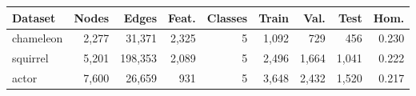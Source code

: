 \begin{tabular}{lrrrrrrrr}
\toprule
Dataset & Nodes & Edges & Feat. & Classes & Train & Val. & Test & Hom. \\
\midrule
chameleon & 2,277 & 31,371 & 2,325 & 5 & 1,092 & 729 & 456 & 0.230 \\
squirrel & 5,201 & 198,353 & 2,089 & 5 & 2,496 & 1,664 & 1,041 & 0.222 \\
actor & 7,600 & 26,659 & 931 & 5 & 3,648 & 2,432 & 1,520 & 0.217 \\
\bottomrule
\end{tabular}
